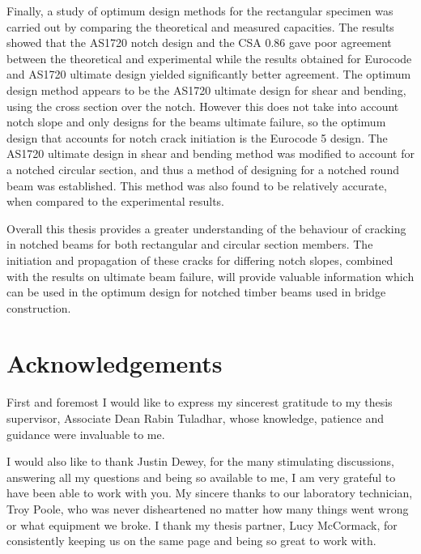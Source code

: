 \documentclass[11pt,a4paper]{article}
\numberwithin{equation}{subsection}
\begin{document}
\noindent
Finally, a study of optimum design methods for the rectangular specimen was carried out by comparing the theoretical and measured capacities. The results showed that the AS1720 notch design and the CSA 0.86 gave poor agreement between the theoretical and experimental while the results obtained for Eurocode and AS1720 ultimate design yielded significantly better agreement. The optimum design method appears to be the AS1720 ultimate design for shear and bending, using the cross section over the notch. However this does not take into account notch slope and only designs for the beams ultimate failure, so the optimum design that accounts for notch crack initiation is the Eurocode 5 design. The AS1720 ultimate design in shear and bending method was modified to account for a notched circular section, and thus a method of designing for a notched round beam was established. This method was also found to be relatively accurate, when compared to the experimental results.

\vspace*{\baselineskip}

\noindent
Overall this thesis provides a greater understanding of the behaviour of cracking in notched beams for both rectangular and circular section members. The initiation and propagation of these cracks for differing notch slopes, combined with the results on ultimate beam failure, will provide valuable information which can be used in the optimum design for notched timber beams used in bridge construction.

\pagebreak

\section*{Acknowledgements}

\noindent
First and foremost I would like to express my sincerest gratitude to my thesis supervisor, Associate Dean Rabin Tuladhar, whose knowledge, patience and guidance were invaluable to me.  

\vspace*{\baselineskip}

\noindent
I would also like to thank Justin Dewey, for the many stimulating discussions, answering all my questions and being so available to me, I am very grateful to have been able to work with you. My sincere thanks to our laboratory technician, Troy Poole, who was never disheartened no matter how many things went wrong or what equipment we broke. I thank my thesis partner, Lucy McCormack, for consistently keeping us on the same page and being so great to work with. 
\end{document}
